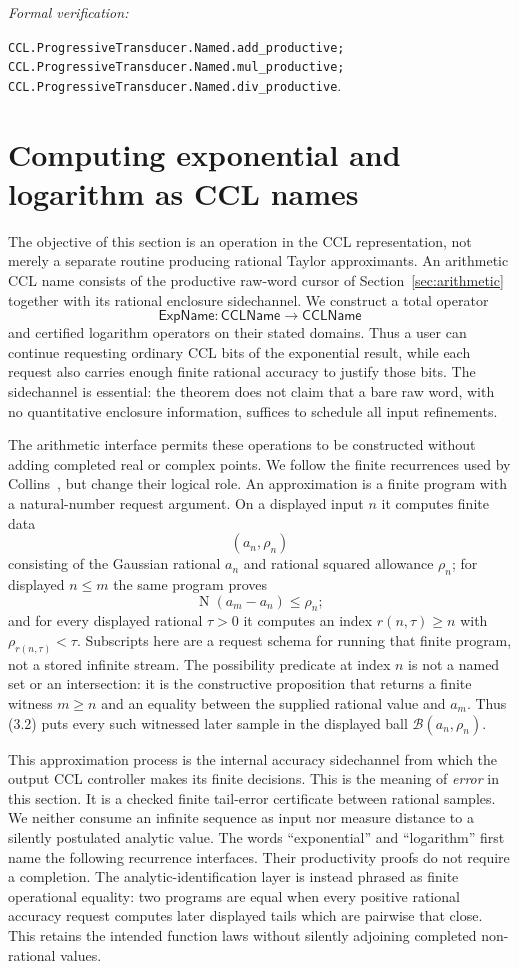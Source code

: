 \documentclass[10pt]{article}
\theoremstyle{definition}
\theoremstyle{remark}
\newcommand{\Norm}{\operatorname{N}}
\newcommand{\leanref}[1]{\par\smallskip\noindent
  \emph{Formal verification:}\par\nobreak
  {\raggedright\nolinkurl{#1}.\par}}
\begin{document}
\leanref{CCL.ProgressiveTransducer.Named.add_productive;
CCL.ProgressiveTransducer.Named.mul_productive;
CCL.ProgressiveTransducer.Named.div_productive}

\section{Computing exponential and logarithm as CCL names}

The objective of this section is an operation in the CCL representation,
not merely a separate routine producing rational Taylor approximants.  An
arithmetic CCL name consists of the productive raw-word cursor of
Section~\ref{sec:arithmetic}
together with its rational enclosure sidechannel.  We construct a total
operator
\[
 \mathsf{ExpName}:\mathsf{CCLName}\longrightarrow\mathsf{CCLName}
\]
and certified logarithm operators on their stated domains.  Thus a user can
continue requesting ordinary CCL bits of the exponential result, while each
request also carries enough finite rational accuracy to justify those bits.
The sidechannel is essential: the theorem does not claim that a bare raw word,
with no quantitative enclosure information, suffices to schedule all input
refinements.

The arithmetic interface permits these operations to be constructed without
adding completed real or complex points.  We follow the finite recurrences
used by Collins~\cite{collins}, but change their logical role.
An approximation is a finite program with a natural-number request argument.
On a displayed input $n$ it computes finite data
\[
 (a_n,\rho_n)
 \tag{3.1}
\]
consisting of the Gaussian rational $a_n$ and rational squared allowance
$\rho_n$; for displayed $n\le m$ the same program proves
\[
 \Norm(a_m-a_n)\le\rho_n;
 \tag{3.2}
\]
and for every displayed rational $\tau>0$ it computes an index
$r(n,\tau)\ge n$ with $\rho_{r(n,\tau)}<\tau$.  Subscripts here are a request
schema for running that finite program, not a stored infinite stream.  The
possibility predicate at index $n$ is not a named set or an intersection: it
is the constructive proposition that returns a finite witness $m\ge n$ and
an equality between the supplied rational value and $a_m$.  Thus (3.2) puts
every such witnessed later sample in the displayed ball
$\mathcal B(a_n,\rho_n)$.

This approximation process is the internal accuracy sidechannel from which
the output CCL controller makes its finite decisions.  This is the meaning of
\emph{error} in this section.  It is a checked finite
tail-error certificate between rational samples.  We neither consume an
infinite sequence as input nor measure distance to a silently postulated
analytic value.  The words ``exponential'' and ``logarithm'' first name the
following recurrence interfaces.  Their productivity proofs do not require a
completion.  The analytic-identification layer is instead phrased as finite
operational equality: two programs are equal when every positive rational
accuracy request computes later displayed tails which are pairwise that
close.  This retains the intended function laws without silently adjoining
completed non-rational values.
\end{document}
